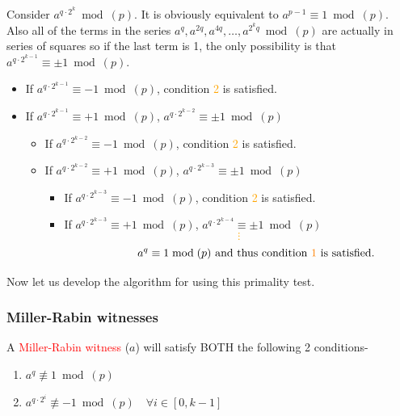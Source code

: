 			\begin{tcolorbox}[breakable, title=Proof,colback=red!5!white,colframe=red!75!black]
				Consider \(a^{q\cdot 2^{k}}\bmod(p)\). It is obviously equivalent to \(a^{p-1}\equiv 1 \bmod(p)\). Also all of the terms in the series \(a^q, a^{2q}, a^{4q}, \ldots, a^{2^{k}q} \bmod(p)\) are actually in series of squares so if the last term is 1, the only possibility is that \(a^{q\cdot 2^{k-1}}\equiv \pm 1 \bmod(p)\). 

				\begin{itemize}
					\item If \(a^{q\cdot 2^{k-1}}\equiv - 1 \bmod(p)\), condition \textcolor{orange}{2} is satisfied.
					\item If \(a^{q\cdot 2^{k-1}}\equiv + 1 \bmod(p)\), \(a^{q\cdot 2^{k-2}}\equiv \pm 1 \bmod(p)\) \small
						\begin{itemize}
							\item If \(a^{q\cdot 2^{k-2}}\equiv - 1 \bmod(p)\), condition \textcolor{orange}{2} is satisfied.
							\item If \(a^{q\cdot 2^{k-2}}\equiv + 1 \bmod(p)\), \(a^{q\cdot 2^{k-3}}\equiv \pm 1 \bmod(p)\) \scriptsize
								\begin{itemize}
									\item If \(a^{q\cdot 2^{k-3}}\equiv - 1 \bmod(p)\), condition \textcolor{orange}{2} is satisfied.
									\item If \(a^{q\cdot 2^{k-3}}\equiv + 1 \bmod(p)\), \(a^{q\cdot 2^{k-4}}\equiv \pm 1 \bmod(p)\)\\
										\textcolor{orange}{\[\vdots\]}\normalsize
										\[\quad \quad \quad a^q\equiv 1 \bmod(p)\text{ and thus condition \textcolor{orange}{1} is satisfied.}\]
								\end{itemize}
						\end{itemize}
				\end{itemize}

			\end{tcolorbox}

			Now let us develop the algorithm for using this primality test.

			\subsubsection{Miller-Rabin witnesses}
			A \textcolor{red}{Miller-Rabin witness} ($a$) will satisfy BOTH the following 2 conditions-
			\begin{enumerate}
				\item \(a^q\not \equiv 1\bmod(p)\)
				\item \(a^{q\cdot 2^i}\not \equiv -1 \bmod(p)\quad \forall i\in [0,k-1]\)
			\end{enumerate}

